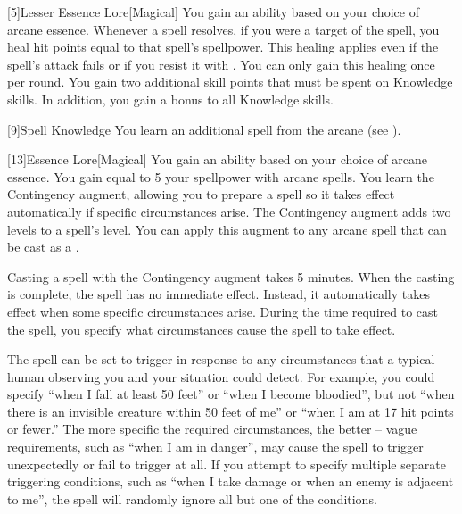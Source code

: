         [5]{Lesser Essence Lore}[Magical]
        You gain an ability based on your choice of arcane essence.
         Whenever a spell resolves, if you were a target of the spell, you heal hit points equal to that spell's spellpower.
        This healing applies even if the spell's attack fails or if you resist it with .
        You can only gain this healing once per round.
         You gain two additional skill points that must be spent on Knowledge skills.
        In addition, you gain a  bonus to all Knowledge skills.

        [9]{Spell Knowledge}
        You learn an additional spell from the arcane  (see ).

        [13]{Essence Lore}[Magical]
        You gain an ability based on your choice of arcane essence.
         You gain  equal to 5 \add your spellpower with arcane spells.
         You learn the Contingency augment, allowing you to prepare a spell so it takes effect automatically if specific circumstances arise.
        The Contingency augment adds two levels to a spell's level.
        You can apply this augment to any arcane spell that can be cast as a .

        Casting a spell with the Contingency augment takes 5 minutes.
        When the casting is complete, the spell has no immediate effect.
        Instead, it automatically takes effect when some specific circumstances arise.
        During the time required to cast the spell, you specify what circumstances cause the spell to take effect.

        The spell can be set to trigger in response to any circumstances that a typical human observing you and your situation could detect.
        For example, you could specify ``when I fall at least 50 feet'' or ``when I become bloodied'', but not ``when there is an invisible creature within 50 feet of me'' or ``when I am at 17 hit points or fewer.''
        The more specific the required circumstances, the better -- vague requirements, such as ``when I am in danger'', may cause the spell to trigger unexpectedly or fail to trigger at all.
        If you attempt to specify multiple separate triggering conditions, such as ``when I take damage or when an enemy is adjacent to me'', the spell will randomly ignore all but one of the conditions.

